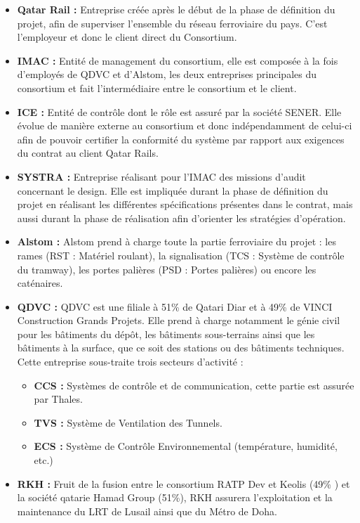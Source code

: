 \begin{itemize}
\item \textbf{Qatar Rail :} Entreprise créée après le début de la phase de définition du projet, afin de superviser l'ensemble du réseau ferroviaire du pays. C'est l'employeur et donc le client direct du Consortium.
\item \textbf{IMAC :} Entité de management du consortium, elle est composée à la fois d'employés de QDVC et d'Alstom, les deux entreprises principales du consortium et fait l'intermédiaire entre le consortium et le client.
\item \textbf{ICE :} Entité de contrôle dont le rôle est assuré par la société SENER. Elle évolue de manière externe au consortium et donc indépendamment  de celui-ci afin de pouvoir certifier la conformité du système par rapport aux exigences du contrat au client Qatar Rails.
\item \textbf{SYSTRA :} Entreprise réalisant pour l'IMAC des missions d'audit concernant le design. Elle est impliquée durant la phase de définition du projet en réalisant les différentes spécifications présentes dans le contrat, mais aussi durant la phase de réalisation afin d'orienter les stratégies d'opération.
\item \textbf{Alstom :} Alstom prend à charge toute la partie ferroviaire du projet : les rames (\gls{RST} : Matériel roulant), la signalisation (\gls{TCS} : Système de contrôle du tramway), les portes palières (\gls{PSD} : Portes palières) ou encore les caténaires.
\item \textbf{QDVC :} QDVC est une  filiale à 51\% de Qatari Diar et à 49\% de VINCI Construction Grands Projets. Elle prend à charge notamment le génie civil pour les bâtiments du dépôt, les bâtiments sous-terrains ainsi que les bâtiments à la surface, que ce soit des stations ou des bâtiments techniques. Cette entreprise sous-traite trois secteurs d'activité :
\begin{itemize}
\item \textbf{\gls{CCS} :} Systèmes de contrôle et de communication, cette partie est assurée par Thales.
\item \textbf{\gls{TVS} :} Système de Ventilation des Tunnels.
\item \textbf{\gls{ECS} :} Système de Contrôle Environnemental (température, humidité, etc.)
\end{itemize}
\item \textbf{RKH :} Fruit de la fusion entre le consortium RATP Dev et Keolis (49\% ) et la société qatarie Hamad Group (51\%), RKH assurera l'exploitation et la maintenance du LRT de Lusail ainsi que du Métro de Doha.
\end{itemize}

